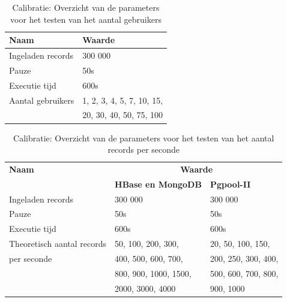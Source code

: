 \begin{table}[h!]
	\centering
	\begin{tabular}{l| l}
	\textbf{Naam} & \textbf{Waarde}  \\
	\hline
	Ingeladen records  & 300 000 \\
	Pauze & 50s \\
	Executie tijd & 600s \\
	Aantal gebruikers & 1, 2, 3, 4, 5, 7, 10, 15, \\
	& 20, 30, 40, 50, 75, 100\\
	\end{tabular}
	\caption{Calibratie: Overzicht van de parameters voor het testen van het aantal gebruikers}
	\label{table:calibratiegebruikers}
\end{table}

\begin{table}[h!]
	\centering
	\begin{tabular}{l| l l }
		\textbf{Naam} & \multicolumn{2}{c}{\textbf{Waarde}}  \\
		
		& \textbf{HBase en MongoDB} & \textbf{Pgpool-II} \\
		\hline
		Ingeladen records  & 300 000 & 300 000 \\
		Pauze & 50s & 50s \\
		Executie tijd & 600s & 600s\\
		Theoretisch aantal records  & 50, 100, 200, 300,   & 20, 50, 100, 150,   \\
		per seconde & 400, 500, 600, 700, & 200, 250, 300, 400,  \\
		& 800, 900, 1000, 1500,  & 500, 600, 700, 800,  \\
		& 2000, 3000, 4000 &  900, 1000 \\
	\end{tabular}
	\caption{Calibratie: Overzicht van de parameters voor het testen van het aantal records per seconde}
	\label{table:calibratiequeriesperseconde}
\end{table}

